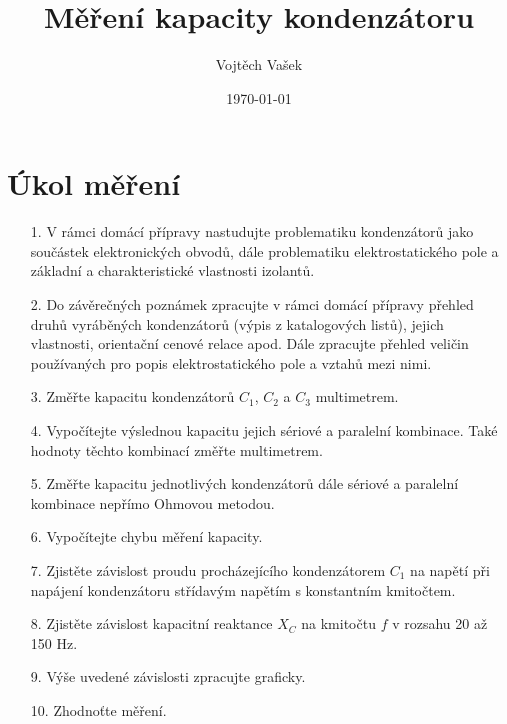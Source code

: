 \documentclass[a4paper,12pt]{report}
\title{Měření kapacity kondenzátoru}
\author{Vojtěch Vašek}
\date{\today}
\begin{document}
\maketitle
\newpage
\chapter*{Úkol měření}
\begin{itemize}
 \item [1.] {V rámci domácí přípravy nastudujte problematiku kondenzátorů jako součástek elektronických obvodů, dále problematiku elektrostatického pole a základní a charakteristické vlastnosti izolantů.}
 \item [2.] {Do závěrečných poznámek zpracujte v rámci domácí přípravy přehled druhů vyráběných kondenzátorů (výpis z katalogových listů), jejich vlastnosti, orientační cenové relace apod. Dále zpracujte přehled veličin používaných pro popis elektrostatického pole a vztahů mezi nimi.}
 \item [3.] {Změřte kapacitu kondenzátorů $C_1$, $C_2$ a $C_3$ multimetrem.}
 \item [4.] {Vypočítejte výslednou kapacitu jejich sériové a paralelní kombinace. Také hodnoty těchto kombinací změřte multimetrem.}
 \item [5.] {Změřte kapacitu jednotlivých kondenzátorů dále sériové a paralelní kombinace nepřímo Ohmovou metodou.}
 \item [6.] {Vypočítejte chybu měření kapacity.}
 \item [7.] {Zjistěte závislost proudu procházejícího kondenzátorem $C_1$ na napětí při napájení kondenzátoru střídavým napětím s konstantním kmitočtem.}
 \item [8.] {Zjistěte závislost kapacitní reaktance $X_C$ na kmitočtu $f$ v rozsahu 20 až 150 Hz.}
 \item [9.] {Výše uvedené závislosti zpracujte graficky.}
 \item [10.] {Zhodnoťte měření.}
\end{itemize}
\newpage
\end{document}

